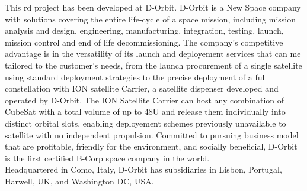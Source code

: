 This \acrshort{rd} project has been developed at D-Orbit. D-Orbit is a New Space company with solutions covering the entire life-cycle of a space mission, including mission analysis and design, engineering, manufacturing, integration, testing, launch, mission control and end of life decommissioning. The company's competitive advantage is in the versatility of its launch and deployement services that can me tailored to the customer's needs, from the launch procurement of a single satellite using standard deployment strategies to the precise deployment of a full constellation with ION satellite Carrier, a satellite dispenser developed and operated by D-Orbit. The ION Satellite Carrier can host any combination of CubeSat with a total volume of up to 48U and release them individually into distinct orbital slots, enabling deployement schemes previously unavailable to satellite with no independent propulsion. Committed to pursuing business model that are profitable, friendly for the environment, and socially beneficial, D-Orbit is the first certified B-Corp space company in the world.\\
Headquartered in Como, Italy, D-Orbit has subsidiaries in Lisbon, Portugal, Harwell, UK, and Washington DC, USA.
